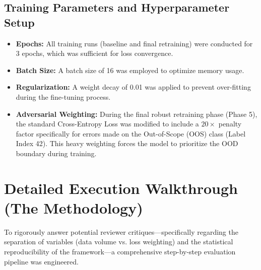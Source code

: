\documentclass[11pt,a4paper]{article}
\begin{document}
\subsection{Training Parameters and Hyperparameter Setup}
\begin{itemize}
    \item \textbf{Epochs:} All training runs (baseline and final retraining) were conducted for 3 epochs, which was sufficient for loss convergence.
    \item \textbf{Batch Size:} A batch size of 16 was employed to optimize memory usage.
    \item \textbf{Regularization:} A weight decay of 0.01 was applied to prevent over-fitting during the fine-tuning process.
    \item \textbf{Adversarial Weighting:} During the final robust retraining phase (Phase 5), the standard Cross-Entropy Loss was modified to include a $20\times$ penalty factor specifically for errors made on the Out-of-Scope (OOS) class (Label Index 42). This heavy weighting forces the model to prioritize the OOD boundary during training.
\end{itemize}

\section{Detailed Execution Walkthrough (The Methodology)}

To rigorously answer potential reviewer critiques—specifically regarding the separation of variables (data volume vs. loss weighting) and the statistical reproducibility of the framework—a comprehensive step-by-step evaluation pipeline was engineered.
\end{document}
